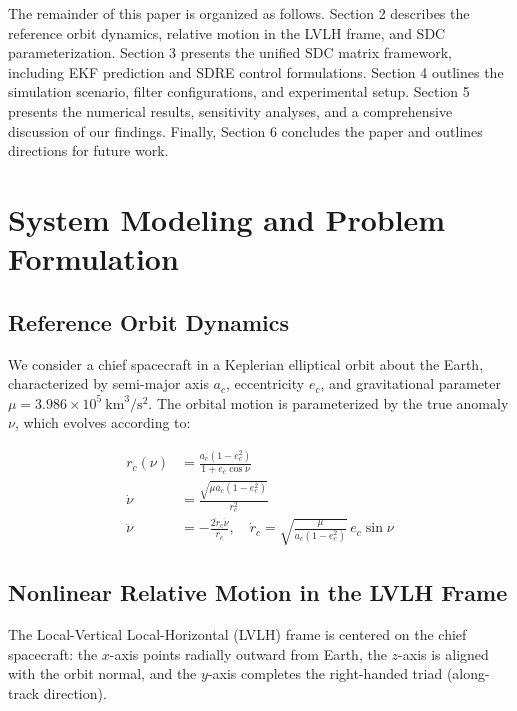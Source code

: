 \documentclass[preprint,3p,times]{elsarticle}
\begin{document}
The remainder of this paper is organized as follows. Section 2 describes the reference orbit dynamics, relative motion in the LVLH frame, and SDC parameterization. Section 3 presents the unified SDC matrix framework, including EKF prediction and SDRE control formulations. Section 4 outlines the simulation scenario, filter configurations, and experimental setup. Section 5 presents the numerical results, sensitivity analyses, and a comprehensive discussion of our findings. Finally, Section 6 concludes the paper and outlines directions for future work.

\section{System Modeling and Problem Formulation}

\subsection{Reference Orbit Dynamics}

We consider a chief spacecraft in a Keplerian elliptical orbit about the Earth, characterized by semi-major axis $a_c$, eccentricity $e_c$, and gravitational parameter $\mu = 3.986 \times 10^5~\text{km}^3/\text{s}^2$. The orbital motion is parameterized by the true anomaly $\nu$, which evolves according to:

\begin{align}
r_c(\nu) &= \frac{a_c(1 - e_c^2)}{1 + e_c \cos \nu} \label{eq:rc} \\
\dot{\nu} &= \frac{\sqrt{\mu a_c (1 - e_c^2)}}{r_c^2} \label{eq:nudot} \\
\ddot{\nu} &= -\frac{2 \dot{r}_c \dot{\nu}}{r_c}, \quad \dot{r}_c = \sqrt{\frac{\mu}{a_c(1-e_c^2)}}\, e_c \sin \nu \label{eq:nuddot}
\end{align}

\subsection{Nonlinear Relative Motion in the LVLH Frame}

The Local-Vertical Local-Horizontal (LVLH) frame is centered on the chief spacecraft: the $x$-axis points radially outward from Earth, the $z$-axis is aligned with the orbit normal, and the $y$-axis completes the right-handed triad (along-track direction).
\end{document}
